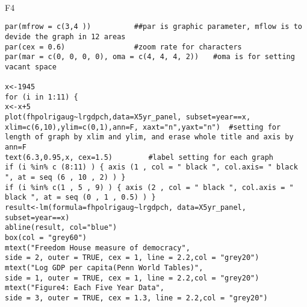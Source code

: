 \\
F4
\begin{lstlisting}
par(mfrow = c(3,4 ))          ##par is graphic parameter, mflow is to devide the graph in 12 areas
par(cex = 0.6)                #zoom rate for characters
par(mar = c(0, 0, 0, 0), oma = c(4, 4, 4, 2))　　#oma is for setting vacant space

x<-1945
for (i in 1:11) {
x<-x+5
plot(fhpolrigaug~lrgdpch,data=X5yr_panel, subset=year==x,
xlim=c(6,10),ylim=c(0,1),ann=F, xaxt="n",yaxt="n")  #setting for length of graph by xlim and ylim, and erase whole title and axis by ann=F
text(6.3,0.95,x, cex=1.5)　　　　　#label setting for each graph
if (i %in% c (8:11) ) { axis (1 , col = " black ", col.axis= " black ", at = seq (6 , 10 , 2) ) }
if (i %in% c(1 , 5 , 9) ) { axis (2 , col = " black ", col.axis = " black ", at = seq (0 , 1 , 0.5) ) }
result<-lm(formula=fhpolrigaug~lrgdpch, data=X5yr_panel, subset=year==x)
abline(result, col="blue")
box(col = "grey60")
mtext("Freedom House measure of democracy", 
side = 2, outer = TRUE, cex = 1, line = 2.2,col = "grey20")
mtext("Log GDP per capita(Penn World Tables)", 
side = 1, outer = TRUE, cex = 1, line = 2.2,col = "grey20")
mtext("Figure4: Each Five Year Data", 
side = 3, outer = TRUE, cex = 1.3, line = 2.2,col = "grey20")

\end{lstlisting}
